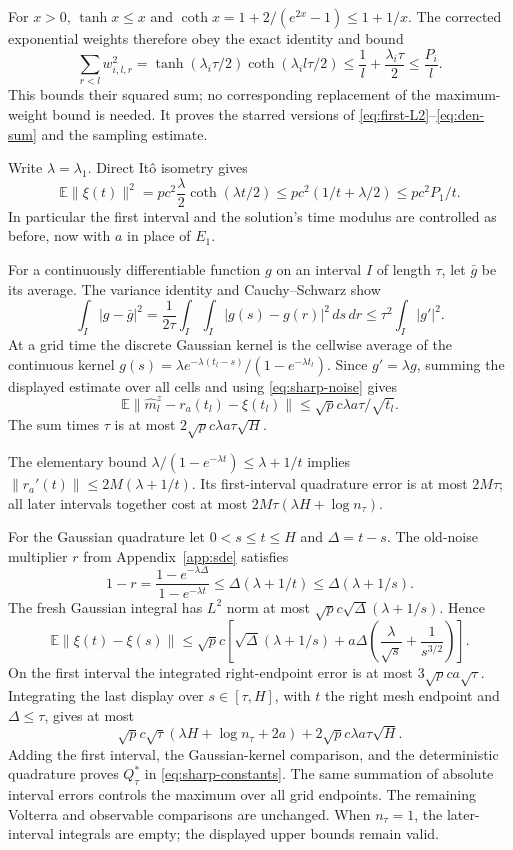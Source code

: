 \documentclass[a4paper,11pt]{article}
\theoremstyle{remark}
\newcommand{\E}{\mathbb E}
\newcommand{\norm}[1]{\lVert#1\rVert}
\begin{document}
For $x>0$, $\tanh x\le x$ and
$\coth x=1+2/(e^{2x}-1)\le1+1/x$. The corrected exponential weights
therefore obey the exact identity and bound
\begin{equation}\label{eq:sharp-weights}
 \sum_{r<l}w_{i,l,r}^2
 =\tanh(\lambda_i\tau/2)\coth(\lambda_i l\tau/2)
 \le\frac1l+\frac{\lambda_i\tau}2\le\frac{P_i}l.
\end{equation}
This bounds their squared sum; no corresponding replacement of the
maximum-weight bound is needed. It proves the starred versions of
\eqref{eq:first-L2}--\eqref{eq:den-sum} and the sampling estimate.

Write $\lambda=\lambda_1$. Direct It\^o isometry gives
\begin{equation}\label{eq:sharp-noise}
 \E\norm{\xi(t)}^2
 =pc^2\frac\lambda2\coth(\lambda t/2)
 \le pc^2(1/t+\lambda/2)\le pc^2P_1/t.
\end{equation}
In particular the first interval and the solution's time modulus are
controlled as before, now with $a$ in place of $E_1$.

For a continuously differentiable function $g$ on an interval $I$ of length
$\tau$, let $\bar g$ be its average. The variance identity and
Cauchy--Schwarz show
\[
 \int_I|g-\bar g|^2
 =\frac1{2\tau}\int_I\int_I|g(s)-g(r)|^2\,ds\,dr
 \le\tau^2\int_I|g'|^2.
\]
At a grid time the discrete Gaussian kernel is the cellwise average of
the continuous kernel $g(s)=\lambda e^{-\lambda(t_l-s)}/(1-e^{-\lambda t_l})$.
Since $g'=\lambda g$, summing the displayed estimate over all cells
and using \eqref{eq:sharp-noise} gives
\[
 \E\norm{\widehat m_l^z-r_a(t_l)-\xi(t_l)}
 \le\sqrt p c\lambda a\tau/\sqrt{t_l}.
\]
The sum times $\tau$ is at most $2\sqrt p c\lambda a\tau\sqrt H$.

The elementary bound
$\lambda/(1-e^{-\lambda t})\le\lambda+1/t$
implies $\norm{r_a'(t)}\le2M(\lambda+1/t)$.
Its first-interval quadrature error is at most $2M\tau$; all later
intervals together cost at most $2M\tau(\lambda H+\log n_\tau)$.

For the Gaussian quadrature let $0<s\le t\le H$ and $\Delta=t-s$.
The old-noise multiplier $r$ from Appendix~\ref{app:sde} satisfies
\[
 1-r=\frac{1-e^{-\lambda\Delta}}{1-e^{-\lambda t}}
 \le\Delta(\lambda+1/t)\le\Delta(\lambda+1/s).
\]
The fresh Gaussian integral has $L^2$ norm at most
$\sqrt p c\sqrt\Delta(\lambda+1/s)$. Hence
\[
 \E\norm{\xi(t)-\xi(s)}
 \le\sqrt p c\left[
 \sqrt\Delta(\lambda+1/s)
 +a\Delta\left(\frac\lambda{\sqrt s}+\frac1{s^{3/2}}\right)\right].
\]
On the first interval the integrated right-endpoint error is at most
$3\sqrt p ca\sqrt\tau$. Integrating the last display over
$s\in[\tau,H]$, with $t$ the right mesh endpoint and $\Delta\le\tau$,
gives at most
\[
 \sqrt p c\sqrt\tau(\lambda H+\log n_\tau+2a)
 +2\sqrt p c\lambda a\tau\sqrt H.
\]
Adding the first interval, the Gaussian-kernel comparison, and the
deterministic quadrature proves $Q_\tau^*$ in \eqref{eq:sharp-constants}.
The same summation of absolute interval errors controls the maximum over
all grid endpoints. The remaining Volterra and observable comparisons
are unchanged. When $n_\tau=1$, the later-interval integrals are empty;
the displayed upper bounds remain valid.
\end{document}
